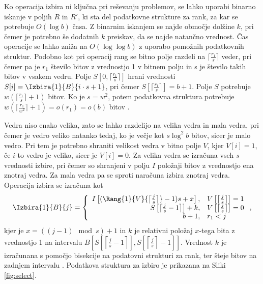 Ko operacija izbira ni ključna pri reševanju problemov, se lahko uporabi binarno iskanje v poljih $R$ in $R'$, ki sta del podatkovne strukture za rank, za kar se potrebuje $O(\log{b})$ časa. Z binarnim iskanjem se najde območje dolžine $k$, pri čemer je potrebno še dodatnih $k$ preiskav, da se najde natančno vrednost.
Čas operacije se lahko zniža na $O(\log\log b)$ z uporabo pomožnih podatkovnih struktur. Podobno kot pri operacij rang se bitno polje razdeli na $\lceil \frac{r_1}{s} \rceil$ veder, pri čemer pa je $r_1$ število bitov z vrednostjo 1 v bitnem polju in s je število takih bitov v vsakem vedru. Polje $S[0,\lceil \frac{r_1}{s} \rceil]$ hrani vrednosti $S[i]=\Izbira{1}{B}{i\cdot s+1}$, pri čemer $S[\lceil \frac{r_1}{s} \rceil]=b+1$. Polje $S$ potrebuje $w(\lceil \frac{r_1}{s} \rceil +1)$ bitov. Ko je $s=w^2$, potem podatkovna struktura potrebuje $w(\lceil\frac{r_1}{w^2}\rceil+1)=o(r_1)=o(b)$ bitov \cite{Navarro2016}.

Vedra niso enako velika, zato se lahko razdelijo na velika vedra in mala vedra, pri čemer je vedro veliko natanko tedaj, ko je večje kot $s\log^2 b$ bitov, sicer je malo vedro. Pri tem je potrebno shraniti velikost vedra v bitno polje $V$, kjer $V[i]=1$, če $i$-to vedro je veliko, sicer je $V[i]=0$. Za velika vedra se izračuna vseh $s$ vrednosti izbire, pri čemer so shranjeni v polju $I$ položaji bitov z vrednostjo ena znotraj vedra. Za mala vedra pa se sproti naračuna izbira znotraj vedra. Operacija izbira se izračuna kot
\begin{equation*}
    \Izbira{1}{B}{j}=\left\{
    \begin{array}{rl}
       I\left[(\Rang{1}{V}{\left\lceil \frac{j}{s} \right\rceil}-1)s+x\right], & V\left[\left\lceil \frac{j}{s} \right\rceil\right] = 1\\ 
       S\left[\left\lceil \frac{j}{s} -1 \right\rceil\right] + k, & V\left[\left\lceil \frac{j}{s} \right\rceil\right] = 0\\
       b+1, & r_1 < j
    \end{array}\right.,
\end{equation*}
kjer je $x = ((j-1) \mod{s})+1$ in $k$ je relativni položaj $x$-tega bita z vrednostjo 1 na intervalu $B\left[ S\left[\left\lceil \frac{j}{s} -1 \right\rceil\right], S\left[\left\lceil \frac{j}{s} \right\rceil-1\right]\right]$. Vrednost $k$ je izračunana s pomočjo bisekcije na podatovni strukturi za rank, ter šteje bitov na zadnjem intervalu \cite{Navarro2016}. Podatkova struktura za izbiro je prikazana na Sliki \ref{fig:select}.

